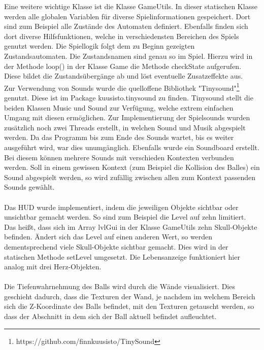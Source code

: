 Eine weitere wichtige Klasse ist die Klasse GameUtils. In dieser statischen Klasse werden alle globalen Variablen für diverse Spielinformationen gespeichert. Dort sind zum Beispiel alle Zustände des Automaten definiert. Ebenfalls finden sich dort diverse Hilfsfunktionen, welche in verschiedensten Bereichen des Spiels genutzt werden. Die Spiellogik folgt dem zu Beginn gezeigten Zustandsautomaten. Die Zustandsnamen sind genau so im Spiel. Hierzu wird in der Methode loop() in der Klasse Game die Methode checkState aufgerufen. Diese bildet die Zustandsübergänge ab und löst eventuelle Zusatzeffekte aus.\\
Zur Verwendung von Sounds wurde die quelloffene Bibliothek "Tinysound"\footnote{https://github.com/finnkuusisto/TinySound} genutzt. Diese ist im Package kuusisto.tinysound zu finden. Tinysound stellt die beiden Klassen Music und Sound zur Verfügung, welche extrem einfachen Umgang mit diesen ermöglichen. Zur Implementierung der Spielsounds wurden zusätzlich noch zwei Threads erstellt, in welchen Sound und Musik abgespielt werden. Da das Programm bis zum Ende des Sounds wartet, bis es weiter ausgeführt wird, war dies unumgänglich. Ebenfalls wurde ein Soundboard erstellt. Bei diesem können mehrere Sounds mit verschieden Kontexten verbunden werden. Soll in einem gewissen Kontext (zum Beispiel die Kollision des Balles) ein Sound abgespielt werden, so wird zufällig zwischen allen zum Kontext passenden Sounds gewählt.\\\\
Das HUD wurde implementiert, indem die jeweiligen Objekte sichtbar oder unsichtbar gemacht werden. So sind zum Beispiel die Level auf zehn limitiert. Das heißt, dass sich im Array lvlGui in der Klasse GameUtils zehn Skull-Objekte befinden. Ändert sich das Level auf einen anderen Wert, so werden dementsprechend viele Skull-Objekte sichtbar gemacht. Dies wird in der statischen Methode setLevel umgesetzt. Die Lebensanzeige funktioniert hier analog mit drei Herz-Objekten.\\\\
Die Tiefenwahrnehmung des Balls wird durch die Wände visualisiert. Dies geschieht dadurch, dass die Texturen der Wand, je nachdem im welchem Bereich sich die Z-Koordinate des Balls befindet, mit den Texturen getauscht werden, so dass der Abschnitt in dem sich der Ball aktuell befindet aufleuchtet.
